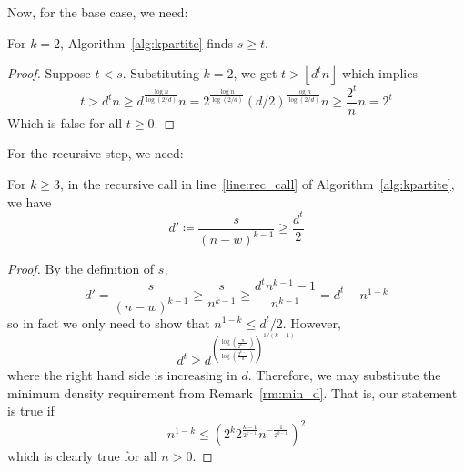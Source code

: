 Now, for the base case, we need:

\begin{lemma}\label{lm:base_case}
    For $k=2$, Algorithm~\ref{alg:kpartite} finds $s \geq t$.
    \begin{proof}
        Suppose $t < s$.
        Substituting $k=2$, we get $t > \left\lfloor d^t n \right\rfloor$ which implies
        \[
            t >
            d^t n \geq
            d^{\frac{\log n}{\log (2/d)}} n =
            2^{\frac{\log n}{\log (2/d)}}(d/2)^{\frac{\log n}{\log (2/d)}} n \geq
            \frac{2^t}{n} n =
            2^t
        \]
        Which is false for all $t \geq 0$.
    \end{proof} %
\end{lemma}

For the recursive step, we need:

\begin{lemma}\label{lm:d_t}
    For $k \geq 3$, in the recursive call in line~\ref{line:rec_call} of Algorithm~\ref{alg:kpartite},
    we have
    \[
        d' \coloneqq \frac{s}{(n-w)^{k-1}} \geq \frac{d^t}{2}
    \]

    \begin{proof}
        By the definition of $s$,
        \[
            d' =
            \frac{s}{(n-w)^{k-1}} \geq
            \frac{s}{n^{k-1}} \geq
            \frac{d^t n^{k-1} - 1 }{n^{k-1}} =
            d^t - n^{1-k}
        \]
        so in fact we only need to show that $n^{1-k} \leq d^t/2$.
        However,
        \[
            d^t \geq
            d^{\left( \frac{\log \left(\frac{n}{2^{k-1}}\right)}{\log \left(\frac{2^{k-1}}{d}\right)} \right)^{1/(k-1)}}
        \]
        where the right hand side is increasing in $d$.
        Therefore, we may substitute the minimum density requirement from Remark~\ref{rm:min_d}.
        That is, our statement is true if
        \[
            n^{1-k} \leq \left(2^{k} 2^{\frac{k - 1}{2^{k-1}}} n^{-\frac{1}{2^{k-1}}}\right)^2
        \]
        which is clearly true for all $n > 0$.
    \end{proof}

\end{lemma}

